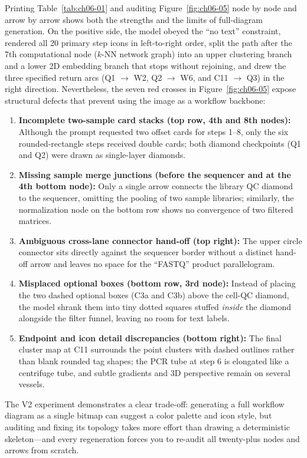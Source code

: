 Printing Table~\ref{tab:ch06-01} and auditing Figure~\ref{fig:ch06-05} node by node and arrow by arrow shows both the strengths and the limits of full-diagram generation. On the positive side, the model obeyed the ``no text'' constraint, rendered all 20 primary step icons in left-to-right order, split the path after the 7th computational node ($k$-NN network graph) into an upper clustering branch and a lower 2D embedding branch that stops without rejoining, and drew the three specified return arcs (Q1 $\rightarrow$ W2, Q2 $\rightarrow$ W6, and C11 $\rightarrow$ Q3) in the right direction. Nevertheless, the seven red crosses in Figure~\ref{fig:ch06-05} expose structural defects that prevent using the image as a workflow backbone:
\begin{enumerate}
\item \textbf{Incomplete two-sample card stacks (top row, 4th and 8th nodes):} Although the prompt requested two offset cards for steps 1--8, only the six rounded-rectangle steps received double cards; both diamond checkpoints (Q1 and Q2) were drawn as single-layer diamonds.
\item \textbf{Missing sample merge junctions (before the sequencer and at the 4th bottom node):} Only a single arrow connects the library QC diamond to the sequencer, omitting the pooling of two sample libraries; similarly, the normalization node on the bottom row shows no convergence of two filtered matrices.
\item \textbf{Ambiguous cross-lane connector hand-off (top right):} The upper circle connector sits directly against the sequencer border without a distinct hand-off arrow and leaves no space for the ``FASTQ'' product parallelogram.
\item \textbf{Misplaced optional boxes (bottom row, 3rd node):} Instead of placing the two dashed optional boxes (C3a and C3b) above the cell-QC diamond, the model shrank them into tiny dotted squares stuffed \emph{inside} the diamond alongside the filter funnel, leaving no room for text labels.
\item \textbf{Endpoint and icon detail discrepancies (bottom right):} The final cluster map at C11 surrounds the point clusters with dashed outlines rather than blank rounded tag shapes; the PCR tube at step 6 is elongated like a centrifuge tube, and subtle gradients and 3D perspective remain on several vessels.
\end{enumerate}

The V2 experiment demonstrates a clear trade-off: generating a full workflow diagram as a single bitmap can suggest a color palette and icon style, but auditing and fixing its topology takes more effort than drawing a deterministic skeleton—and every regeneration forces you to re-audit all twenty-plus nodes and arrows from scratch.

